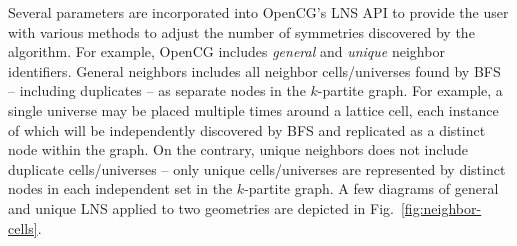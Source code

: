 Several parameters are incorporated into OpenCG's \ac{LNS} \ac{API} to provide the user with various methods to adjust the number of symmetries discovered by the algorithm. For example, OpenCG includes \textit{general} and \textit{unique} neighbor identifiers. General neighbors includes all neighbor cells/universes found by \ac{BFS} -- including duplicates -- as separate nodes in the $k$-partite graph. For example, a single universe may be placed multiple times around a lattice cell, each instance of which will be independently discovered by \ac{BFS} and replicated as a distinct node within the graph. On the contrary, unique neighbors does not include duplicate cells/universes -- only unique cells/universes are represented by distinct nodes in each independent set in the $k$-partite graph. A few diagrams of general and unique \ac{LNS} applied to two geometries are depicted in Fig.~\ref{fig:neighbor-cells}.

